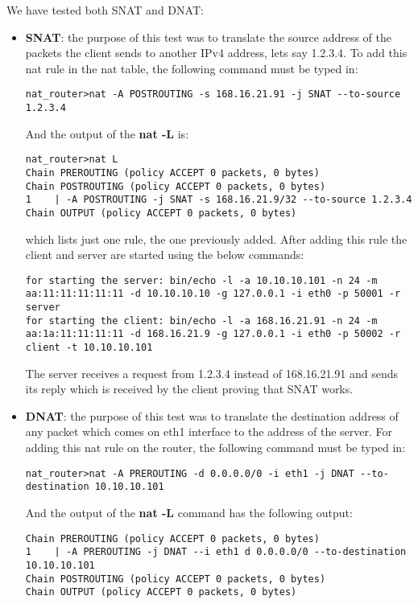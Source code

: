 {{We have tested both SNAT and DNAT:
\begin{itemize}
\item \textbf{SNAT}: the purpose of this test was to translate the source address of the packets the client sends to another IPv4 address, lets say 1.2.3.4.
To add this nat rule in the nat table, the following command must be typed in:
\lstset{language=TeX, caption=Add SNAT rule}
\begin{lstlisting}
nat_router>nat -A POSTROUTING -s 168.16.21.91 -j SNAT --to-source 1.2.3.4
\end{lstlisting}
\pagebreak
And the output of the \textbf{nat -L} is:
\lstset{language=TeX, caption=List all rules for standard NAT chains}
\begin{lstlisting}
nat_router>nat L
Chain PREROUTING (policy ACCEPT 0 packets, 0 bytes)
Chain POSTROUTING (policy ACCEPT 0 packets, 0 bytes)
1	 | -A POSTROUTING -j SNAT -s 168.16.21.9/32 --to-source 1.2.3.4
Chain OUTPUT (policy ACCEPT 0 packets, 0 bytes)
\end{lstlisting}

which lists just one rule, the one previously added. 
After adding this rule the client and server are started using the below commands:
\lstset{language=TeX, caption=SNAT-starting client and server applications}
\begin{lstlisting}
for starting the server: bin/echo -l -a 10.10.10.101 -n 24 -m aa:11:11:11:11:11 -d 10.10.10.10 -g 127.0.0.1 -i eth0 -p 50001 -r server 
for starting the client: bin/echo -l -a 168.16.21.91 -n 24 -m aa:1a:11:11:11:11 -d 168.16.21.9 -g 127.0.0.1 -i eth0 -p 50002 -r client -t 10.10.10.101
\end{lstlisting}
 The server receives a request from 1.2.3.4 instead of 168.16.21.91 and sends its reply which is 
received by the client proving that SNAT works.
\item \label{nat-impl:DNAT} \textbf{DNAT}: the purpose of this test was to translate the destination 
address of any packet which comes on eth1 interface to the address of the server.
For adding this nat rule on the router, the following command must be typed in:
\lstset{language=TeX, caption=Add DNAT rule}
\begin{lstlisting}
nat_router>nat -A PREROUTING -d 0.0.0.0/0 -i eth1 -j DNAT --to-destination 10.10.10.101
\end{lstlisting}
And the output of the \textbf{nat -L} command has the following output:
\lstset{language=TeX, caption=List all rules for standard NAT chains}
\begin{lstlisting}
Chain PREROUTING (policy ACCEPT 0 packets, 0 bytes)
1	 | -A PREROUTING -j DNAT --i eth1 d 0.0.0.0/0 --to-destination 10.10.10.101
Chain POSTROUTING (policy ACCEPT 0 packets, 0 bytes)
Chain OUTPUT (policy ACCEPT 0 packets, 0 bytes)
\end{lstlisting}


\end{itemize}}}
